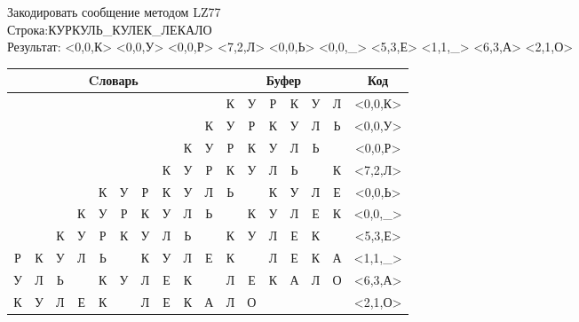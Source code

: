 \documentclass[a4paper, 12pt]{article}
\begin{document}
Закодировать сообщение методом LZ77\\
Строка:КУРКУЛЬ\_КУЛЕК\_ЛЕКАЛО\\
Результат: <0,0,К> <0,0,У> <0,0,Р> <7,2,Л> <0,0,Ь> <0,0,\_> <5,3,Е> <1,1,\_> <6,3,А> <2,1,О>\\
\begin{table}[h!]
\centering
\begin{tabular}{|c|c|c|c|c|c|c|c|c|c|c|c|c|c|c|c|c|} 
\hline
\multicolumn{10}{|c|}{Cловарь} & \multicolumn{6}{c|}{Буфер} & Код  \\ \hline
  &   &   &   &   &   &   &   &   &   & \cellcolor[HTML]{8CE4F6} К & У & Р & К & У & Л & <0,0,К>
\\ \hline
  &   &   &   &   &   &   &   &   & К & \cellcolor[HTML]{8CE4F6} У & Р & К & У & Л & Ь & <0,0,У>
\\ \hline
  &   &   &   &   &   &   &   & К & У & \cellcolor[HTML]{8CE4F6} Р & К & У & Л & Ь &   & <0,0,Р>
\\ \hline
  &   &   &   &   &   &   & \cellcolor[HTML]{FFFF00} К & \cellcolor[HTML]{FFFF00} У & Р & \cellcolor[HTML]{FFFF00} К & \cellcolor[HTML]{FFFF00} У & \cellcolor[HTML]{8CE4F6} Л & Ь &   & К & <7,2,Л>
\\ \hline
  &   &   &   & К & У & Р & К & У & Л & \cellcolor[HTML]{8CE4F6} Ь &   & К & У & Л & Е & <0,0,Ь>
\\ \hline
  &   &   & К & У & Р & К & У & Л & Ь & \cellcolor[HTML]{8CE4F6}   & К & У & Л & Е & К & <0,0,\_>
\\ \hline
  &   & К & У & Р & \cellcolor[HTML]{FFFF00} К & \cellcolor[HTML]{FFFF00} У & \cellcolor[HTML]{FFFF00} Л & Ь &   & \cellcolor[HTML]{FFFF00} К & \cellcolor[HTML]{FFFF00} У & \cellcolor[HTML]{FFFF00} Л & \cellcolor[HTML]{8CE4F6} Е & К &   & <5,3,Е>
\\ \hline
Р & \cellcolor[HTML]{FFFF00} К & У & Л & Ь &   & К & У & Л & Е & \cellcolor[HTML]{FFFF00} К & \cellcolor[HTML]{8CE4F6}   & Л & Е & К & А & <1,1,\_>
\\ \hline
У & Л & Ь &   & К & У & \cellcolor[HTML]{FFFF00} Л & \cellcolor[HTML]{FFFF00} Е & \cellcolor[HTML]{FFFF00} К &   & \cellcolor[HTML]{FFFF00} Л & \cellcolor[HTML]{FFFF00} Е & \cellcolor[HTML]{FFFF00} К & \cellcolor[HTML]{8CE4F6} А & Л & О & <6,3,А>
\\ \hline
К & У & \cellcolor[HTML]{FFFF00} Л & Е & К &   & Л & Е & К & А & \cellcolor[HTML]{FFFF00} Л & \cellcolor[HTML]{8CE4F6} О &   &   &   &   & <2,1,О>
\\ \hline
\end{tabular}
\end{table}
\end{document}
